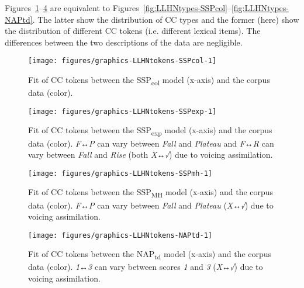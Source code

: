 Figures~\ref{fig:LLHNtokens-SSPcol}--\ref{fig:LLHNtokens-NAPtd} are equivalent to Figures~\ref{fig:LLHNtypes-SSPcol}--\ref{fig:LLHNtypes-NAPtd}. The latter show the distribution of CC types and the former (here) show the distribution of different CC tokens (i.e. different lexical items). The differences between the two descriptions of the data are negligible.\largerpage[2]


\begin{figure}
\texttt{[image: figures/graphics-LLHNtokens-SSPcol-1]}
\caption{Fit of CC tokens between the SSP\textsubscript{col} model (x-axis) and the corpus data (color).}\label{fig:LLHNtokens-SSPcol}
\end{figure}


\begin{figure}
\texttt{[image: figures/graphics-LLHNtokens-SSPexp-1]} 
\caption{Fit of CC tokens between the SSP\textsubscript{exp} model (x-axis) and the corpus data (color). \emph{F↔P} can vary between \emph{Fall} and \emph{Plateau} and \emph{F↔R} can vary between \emph{Fall} and \emph{Rise} (both \emph{X↔√}) due to voicing assimilation.}\label{fig:LLHNtokens-SSPexp}
\end{figure}


\begin{figure}
\texttt{[image: figures/graphics-LLHNtokens-SSPmh-1]} 
\caption{Fit of CC tokens between the SSP\textsubscript{MH} model (x-axis) and the corpus data (color). \emph{F↔P} can vary between \emph{Fall} and \emph{Plateau} (\emph{X↔√}) due to voicing assimilation.}\label{fig:LLHNtokens-SSPmh}
\end{figure}


\begin{figure}
\texttt{[image: figures/graphics-LLHNtokens-NAPtd-1]} 
\caption{Fit of CC tokens between the NAP\textsubscript{td} model (x-axis) and the corpus data (color). \emph{1↔3} can vary between scores \emph{1} and \emph{3} (\emph{X↔√}) due to voicing assimilation.}\label{fig:LLHNtokens-NAPtd}
\end{figure}
